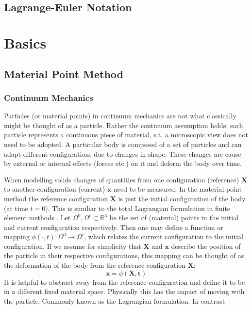 \documentclass[m,times]{cgMA}
\begin{document}
\subsection{Lagrange-Euler Notation}
\section{Basics}
\subsection{Material Point Method}
\subsubsection{Continuum Mechanics}
Particles (or material points) in continuum mechanics are not what classically might be thought of as a particle. Rather the continuum assumption holds: each particle represents a continuous piece of material, s.t. a microscopic view does not need to be adopted. A particular body is composed of a set of particles and can adapt different configurations due to changes in shape. These changes are cause by external or internal effects (forces etc.) on it and deform the body over time. \cite{MIT:CONTINUUM_MECHANICS} \cite{MPM:COURSE}


When modelling solids changes of quantities from one configuration (reference) $\mathbf{X}$ to another configuration (current) $\mathbf{x}$ need to be measured. In the material point method the reference configuration $\mathbf{X}$ is just the initial configuration of the body (at time $t=0$). This is similiar to the total Lagrangian formulation in finite element methods \cite{bathe2006finite}.
Let $\Omega ^ { 0 } , \Omega ^ { t } \subset \mathbb { R } ^ { \mathrm { 3 } }$ be the set of (material) points in the initial and current configuration respectively.  Then one may define a function or mapping $\phi ( \cdot , t ) : \Omega ^ { 0 } \rightarrow \Omega ^ { t }$, which relates the current configuration to the initial configuration. If we assume for simplicity that $\mathbf{X}$ and $\mathbf{x}$ describe the position of the particle in their respective configurations, this mapping can be thought of as the deformation of the body from the reference configuration $\mathbf{X}$:
\begin{equation}
  \mathbf{x} =  \phi ( \mathbf { X } , \mathbf { t } )
\end{equation}
It is helpful to abstract away from the reference configuration and define it to be in a different fixed material space. Physically this has the impact of moving with the particle. Commonly known as the Lagrangian formulation. In contrast
\end{document}
